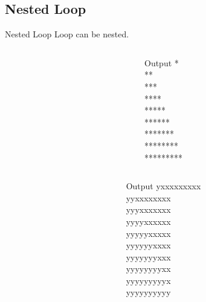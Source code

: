 \documentclass[aspectratio=43]{beamer}
\begin{document}
\subsection[Nested Loop]{Nested Loop}
\begin{frame}{Nested Loop}
    Loop can be nested.
    \begin{columns}
        \begin{column}{0.5\textwidth}
            \begin{example}
                
            \end{example}
        \end{column}
        \begin{column}{0.5\textwidth}  %
            \begin{block}{Output}
                * \\
                ** \\
                *** \\
                **** \\
                ***** \\
                ****** \\
                ******* \\
                ******** \\
                ********* \\
            \end{block}

        \end{column}
    \end{columns}
\end{frame}


\begin{frame}
    \begin{columns}
        \begin{column}{0.5\textwidth}
            \begin{example}
                
            \end{example}
        \end{column}
        \begin{column}{0.5\textwidth}
            \begin{block}{Output}
                yxxxxxxxxx\\
                yyxxxxxxxx\\
                yyyxxxxxxx\\
                yyyyxxxxxx\\
                yyyyyxxxxx\\
                yyyyyyxxxx\\
                yyyyyyyxxx\\
                yyyyyyyyxx\\
                yyyyyyyyyx\\
                yyyyyyyyyy
            \end{block}

        \end{column}
    \end{columns}
\end{frame}
\end{document}
